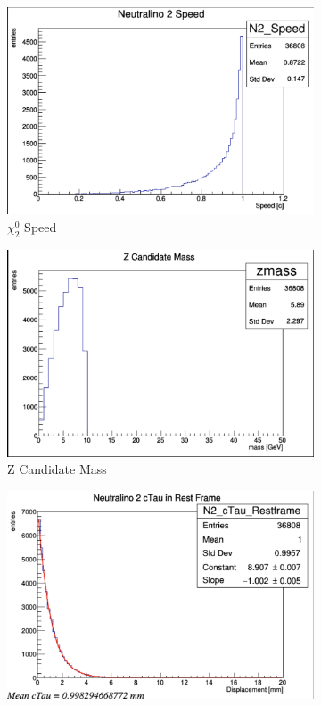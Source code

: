 \documentclass{article}
\begin{document}
\begin{figure} [H]
\begin{subfigure}{.5\textwidth}
  \centering
  \includegraphics[width=.8\linewidth]{ZBeta.png}  
  \caption{$\chi_{2}^{0}$ Speed}
  \label{fig:sub-first}
\end{subfigure}
\begin{subfigure}{.5\textwidth}
  \centering
  \includegraphics[width=.8\linewidth]{ZMass.png}  
  \caption{Z Candidate Mass}
  \label{fig:sub-second}
\end{subfigure}
\begin{subfigure}{.5\textwidth}
  \centering
  \includegraphics[width=.8\linewidth]{ctau.png}  

\end{subfigure}
\end{figure}
\end{document}
